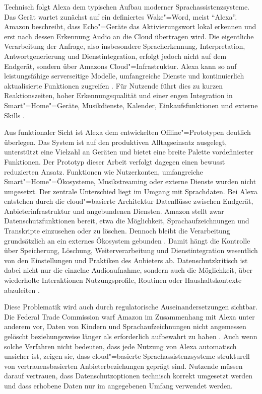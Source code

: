 Technisch folgt Alexa dem typischen Aufbau moderner Sprachassistenzsysteme. Das Gerät wartet zunächst auf ein definiertes Wake"=Word, meist \enquote{Alexa}. Amazon beschreibt, dass Echo"=Geräte das Aktivierungswort lokal erkennen und erst nach dessen Erkennung Audio an die Cloud übertragen wird. Die eigentliche Verarbeitung der Anfrage, also insbesondere Spracherkennung, Interpretation, Antwortgenerierung und Dienstintegration, erfolgt jedoch nicht auf dem Endgerät, sondern über Amazons Cloud"=Infrastruktur. Alexa kann so auf leistungsfähige serverseitige Modelle, umfangreiche Dienste und kontinuierlich aktualisierte Funktionen zugreifen \autocite{alexaKannIchDirVertrauen}. Für Nutzende führt dies zu kurzen Reaktionszeiten, hoher Erkennungsqualität und einer engen Integration in Smart"=Home"=Geräte, Musikdienste, Kalender, Einkaufsfunktionen und externe Skills \autocite{alexaKannIchDirVertrauen, Alexa-Documentation}.

Aus funktionaler Sicht ist Alexa dem entwickelten Offline"=Prototypen deutlich überlegen. Das System ist auf den produktiven Alltagseinsatz ausgelegt, unterstützt eine Vielzahl an Geräten und bietet eine breite Palette vordefinierter Funktionen. Der Prototyp dieser Arbeit verfolgt dagegen einen bewusst reduzierten Ansatz. Funktionen wie Nutzerkonten, umfangreiche Smart"=Home"=Ökosysteme, Musikstreaming oder externe Dienste wurden nicht umgesetzt. Der zentrale Unterschied liegt im Umgang mit Sprachdaten. Bei Alexa entstehen durch die cloud"=basierte Architektur Datenflüsse zwischen Endgerät, Anbieterinfrastruktur und angebundenen Diensten. Amazon stellt zwar Datenschutzfunktionen bereit, etwa die Möglichkeit, Sprachaufzeichnungen und Transkripte einzusehen oder zu löschen. Dennoch bleibt die Verarbeitung grundsätzlich an ein externes Ökosystem gebunden \autocite{alexaKannIchDirVertrauen, Alexa-Documentation}. Damit hängt die Kontrolle über Speicherung, Löschung, Weiterverarbeitung und Dienstintegration wesentlich von den Einstellungen und Praktiken des Anbieters ab. Datenschutzkritisch ist dabei nicht nur die einzelne Audioaufnahme, sondern auch die Möglichkeit, über wiederholte Interaktionen Nutzungsprofile, Routinen oder Haushaltskontexte abzuleiten \autocite{alexaKannIchDirVertrauen}.

Diese Problematik wird auch durch regulatorische Auseinandersetzungen sichtbar. Die Federal Trade Commission warf Amazon im Zusammenhang mit Alexa unter anderem vor, Daten von Kindern und Sprachaufzeichnungen nicht angemessen gelöscht beziehungsweise länger als erforderlich aufbewahrt zu haben \autocite{AlexaCharge}. Auch wenn solche Verfahren nicht bedeuten, dass jede Nutzung von Alexa automatisch unsicher ist, zeigen sie, dass cloud"=basierte Sprachassistenzsysteme strukturell von vertrauensbasierten Anbieterbeziehungen geprägt sind. Nutzende müssen darauf vertrauen, dass Datenschutzoptionen technisch korrekt umgesetzt werden und dass erhobene Daten nur im angegebenen Umfang verwendet werden.


